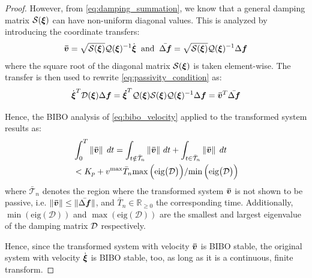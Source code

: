 \begin{proof}
However, from \eqref{eq:damping_summation}, we know that a general damping matrix $\mathcal{S}(\boldsymbol{\xi})$ can have non-uniform diagonal values. This is analyzed by introducing the coordinate transfers:
\begin{equation}
	\boldsymbol{\bar{v}} = \sqrt{\mathcal{S}({\boldsymbol{\xi}})} \mathcal{Q}({\boldsymbol{\xi}})^{-1} \dot{{\boldsymbol{\xi}}}
	\;\; \text{and} \;\;
	\bar{\Delta \boldsymbol{f}} = \sqrt{\mathcal{S}({\boldsymbol{\xi}})} \mathcal{Q}({\boldsymbol{\xi}})^{-1} \Delta \boldsymbol{f}
\end{equation}
where the square root of the diagonal matrix $\mathcal{S}({\boldsymbol{\xi}})$ is taken element-wise.
The transfer is then used to rewrite \eqref{eq:passivity_condition} as:
\begin{equation}
\dot{\boldsymbol{\xi}}^T \mathcal{D}({\boldsymbol{\xi}}) \Delta \boldsymbol{f} = \boldsymbol{\dot \xi}^T \mathcal{Q}({\boldsymbol{\xi}}) \mathcal{S}({\boldsymbol{\xi}}) \mathcal{Q}({\boldsymbol{\xi}})^{-1} \Delta \boldsymbol{f} = \boldsymbol{\bar v}^T \bar{\Delta \boldsymbol{f}}
\end{equation}

Hence, the BIBO analysis of \eqref{eq:bibo_velocity} applied to the transformed system results as:
\begin{equation}
\begin{split}
	  & \int_{0}^{T} \left\| \boldsymbol{\bar v} \right\| \; dt   
	   = \int_{t \notin \bar{\mathcal{T}}_n} \left\| \boldsymbol{\bar v} \right\|  \, dt + \int_{t \in  \bar{\mathcal{T}}_n} \left\| \boldsymbol{\bar v} \right\| \;  dt  \\ 
   & < K_p + v^{\mathrm{max}} \bar T_n 
   {\max{\Bigl(\text{eig}\bigl(\mathcal{D} \bigr) \Bigr)}} 
   / {\min{\Bigl(\text{eig}\bigl(\mathcal{D} \bigr) \Bigr)}}
\end{split}
\end{equation}
where $\bar{\mathcal{T}}_n$ denotes the region where the transformed system $\boldsymbol{\bar v}$ is not shown to be passive, i.e. $\| \boldsymbol{\bar v} \| \leq \| \bar{\Delta \boldsymbol{f}} \|$, and $\bar T_n \in \mathbb{R}_{\geq 0}$ the corresponding time. Additionally, $\min{(\text{eig}(\mathcal{D}))}$ and $\max{(\text{eig}(\mathcal{D}))}$ are the smallest and largest eigenvalue of the damping matrix $\mathcal{D}$ respectively.

Hence, since the transformed system with velocity $\boldsymbol{\bar v}$ is BIBO stable, the original system with velocity $\dot{\boldsymbol{\xi}}$ is BIBO stable, too, as long as it is a continuous, finite transform. 
\end{proof}

